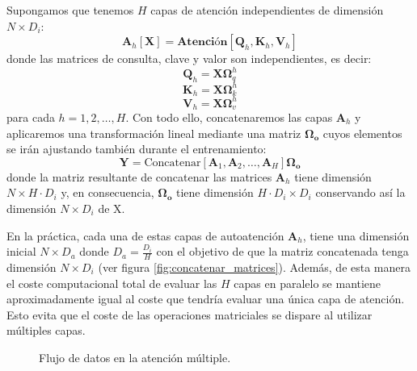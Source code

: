 Supongamos que tenemos $H$ capas de atención independientes de dimensión $N \times D_i$:
\begin{equation}
    \mathbf{A}_h[\mathbf{X}]= \textbf{Atención}[\mathbf{Q}_h,\mathbf{K}_h, \mathbf{V}_h]
\end{equation}
donde las matrices de consulta, clave y valor son independientes, es decir:
\begin{equation}
    \mathbf{Q}_h = \mathbf{X}\mathbf{\Omega}_{q}^h 
    \label{omega_q_h}
\end{equation}
\begin{equation}
    \mathbf{K}_h = \mathbf{X}\mathbf{\Omega}_{k}^h
    \label{omega_k_h}
\end{equation}
\begin{equation}
    \mathbf{V}_h = \mathbf{X}\mathbf{\Omega}_{v}^h
    \label{omega_v_h}
\end{equation}
para cada $h = 1,2,\dots,H$. Con todo ello, concatenaremos las capas 
$\mathbf{A}_h$ y aplicaremos una transformación lineal mediante una matriz $\mathbf{\Omega_o}$ cuyos elementos se irán ajustando también durante el entrenamiento:
\begin{equation}
    \mathbf{Y} = \text{Concatenar} [\mathbf{A}_1,\mathbf{A}_2, \dots, \mathbf{A}_H]\mathbf{\Omega_o}
    \label{multiples_capas}
\end{equation}
donde la matriz resultante de concatenar las matrices $\mathbf{A}_h$ 
tiene dimensión \mbox{$N \times H \cdot D_i$} y, en consecuencia, $\mathbf{\Omega_o}$ tiene dimensión $H \cdot D_i \times D_i$ conservando así la dimensión $N \times D_i$ de X.

En la práctica,  cada una de estas capas de autoatención $\mathbf{A}_h$, 
tiene una dimensión inicial $N \times D_a$ donde $D_a = \frac{D_i}{H}$ con 
el objetivo de que la matriz concatenada tenga dimensión $N \times D_i$ 
(ver figura \ref{fig:concatenar_matrices}). Además, de esta manera el coste 
computacional total de evaluar las $H$ capas en paralelo se mantiene 
aproximadamente igual al coste que tendría evaluar una única capa de atención.
Esto evita que el coste de las operaciones matriciales se dispare al utilizar 
múltiples capas.

\begin{figure}[t]
    \vspace{0.8cm}
    \centering
    \FlujoAtencionMultiple
    \caption{Flujo de datos en la atención múltiple. }
    \label{fig:Flujo_atencion_multiple}
    \vspace{0.8cm}
\end{figure}




